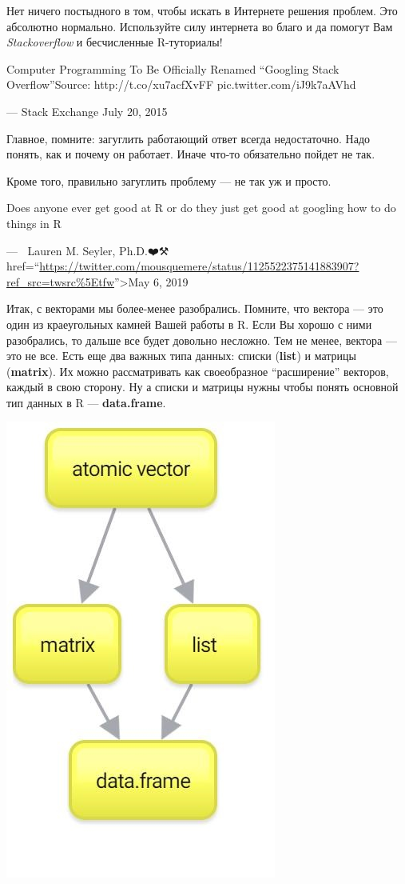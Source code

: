 \documentclass[]{book}
\begin{document}
Нет ничего постыдного в том, чтобы искать в Интернете решения проблем. Это абсолютно нормально. Используйте силу интернета во благо и да помогут Вам \emph{Stackoverflow} и бесчисленные R-туториалы!

Computer Programming To Be Officially Renamed ``Googling Stack Overflow''Source: http://t.co/xu7acfXvFF pic.twitter.com/iJ9k7aAVhd

--- Stack Exchange July 20, 2015

Главное, помните: загуглить работающий ответ всегда недостаточно. Надо понять, как и почему он работает. Иначе что-то обязательно пойдет не так.

Кроме того, правильно загуглить проблему --- не так уж и просто.

Does anyone ever get good at R or do they just get good at googling how to do things in R

--- 🔬🖤Lauren M. Seyler, Ph.D.❤️⚒ href=``\url{https://twitter.com/mousquemere/status/1125522375141883907?ref_src=twsrc\%5Etfw}''\textgreater May 6, 2019

Итак, с векторами мы более-менее разобрались. Помните, что вектора --- это один из краеугольных камней Вашей работы в R. Если Вы хорошо с ними разобрались, то дальше все будет довольно несложно. Тем не менее, вектора --- это не все. Есть еще два важных типа данных: списки (\textbf{list}) и матрицы (\textbf{matrix}). Их можно рассматривать как своеобразное ``расширение'' векторов, каждый в свою сторону. Ну а списки и матрицы нужны чтобы понять основной тип данных в R --- \textbf{data.frame}.

\includegraphics{images/New-Mind-Map.jpg}
\end{document}
